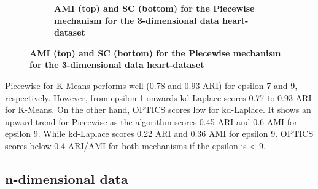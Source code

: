 \begin{figure}[H]
\begin{subfigure}{1\textwidth}
        \caption{\textbf{AMI (top) and SC (bottom) for the Piecewise mechanism for the 3-dimensional data heart-dataset}}
    \end{subfigure}
    \label{fig:validation-heart-dataset_comparison_3d-laplace}
\end{figure}

Piecewise for K-Means performs well (0.78 and 0.93 ARI) for epsilon 7 and 9, respectively.
However, from epsilon 1 onwards kd-Laplace scores 0.77 to 0.93 ARI for K-Means.
On the other hand, OPTICS scores low for kd-Laplace.
It shows an upward trend for Piecewise as the algorithm scores 0.45 ARI and 0.6 AMI for epsilon 9.
While kd-Laplace scores 0.22 ARI and 0.36 AMI for epsilon 9.
OPTICS scores below 0.4 ARI/AMI for both mechanisms if the epsilon is < 9.
\newpage
\subsection{n-dimensional data}
